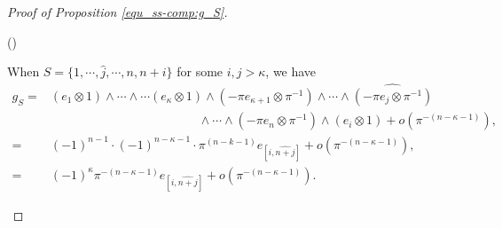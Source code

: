 \documentclass[pdflatex,sn-mathphys-num]{sn-jnl}%
\theoremstyle{thmstyleone}%
\theoremstyle{thmstyletwo}%
\numberwithin{equation}{subsection}
\theoremstyle{thmstylethree}%
\newcommand{\wh}{\widehat}
\newenvironment{altenumerate}
	{\begin{list}
			{(\theenumi) }
			{\usecounter{enumi}
				\setlength{\labelwidth}{0pt}
				\setlength{\labelsep}{0pt}
				\setlength{\leftmargin}{0pt}
				\setlength{\itemsep}{\the\smallskipamount}
				\renewcommand{\theenumi}{\roman{enumi}}
		}}
		{\end{list}}
\begin{document}
\begin{proof}[Proof of Proposition \ref{equ_ss-comp:g_S}]
\begin{altenumerate}
				
				
				
	\item When $S=\{1,\cdots,\wh{j},\cdots,n,n+i\}$ for some $i,j>\kappa$, we have
	\begin{align*}
		g_S={}&
		(e_1\otimes 1)\wedge\cdots\wedge\cdots(e_\kappa\otimes 1)\wedge(-\pi e_{\kappa+1}\otimes \pi^{-1})\wedge\cdots\wedge\wh{(-\pi e_j\otimes \pi^{-1})}\\
		&\hspace{5cm}\wedge\cdots\wedge(-\pi e_n\otimes \pi^{-1})\wedge(e_i\otimes 1)+o(\pi^{-(n-\kappa-1)}),\\
		={}&(-1)^{n-1}\cdot(-1)^{n-\kappa-1}\cdot\pi^{(n-k-1)}e_{[i,\wh{n+j}]}+o(\pi^{-(n-\kappa-1)}),\\
		={}&(-1)^{\kappa}\pi^{-(n-\kappa-1)}e_{[i,\wh{n+j}]}+o(\pi^{-(n-\kappa-1)}).
	\end{align*}

\end{altenumerate}
\end{proof}
		
\end{document}

